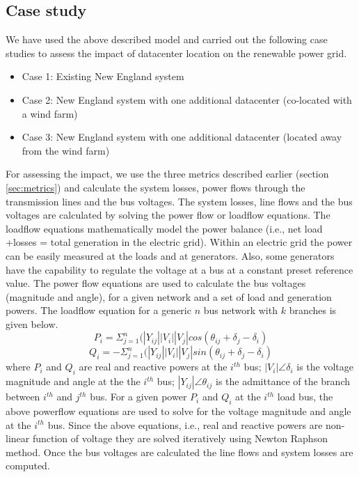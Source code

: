 \begin{itemize}
{\begin{table}[ht]
\begin{center}
\begin{tabular}{|l|l|c|c|}
\end{tabular}
   \vspace{.05in}
\label{tab:wf_setting}
\end{center}
\end{table}
}
\end{itemize}
\subsection{Case study}
We have used the above described model and carried out the following case studies to assess the impact of datacenter location on the renewable power grid.
\begin{itemize}
\item{Case 1: Existing New England system}
\item{Case 2: New England system with one additional datacenter (co-located with a wind farm)}
\item{Case 3: New England system with one additional datacenter (located away from the wind farm)}
\end{itemize}
For assessing the impact, we use the three metrics described earlier (section \ref{sec:metrics}) and calculate the system losses, power flows through the transmission lines and the bus voltages.
The system losses, line flows and the bus voltages are calculated by solving the power flow or loadflow equations. The loadflow equations mathematically model the power balance (i.e., net load +losses = total generation in the electric grid). Within an electric grid the power can be easily measured at the loads and at generators. Also, some generators have the capability to regulate the voltage at a bus at a constant preset reference value. The power flow equations are used to calculate the bus voltages (magnitude and angle), for a given network and a set of load and generation powers. The loadflow equation for a generic $n$ bus network with $k$ branches is given below.
\begin{equation}
P_{i} = \Sigma_{j=1}^{n}(|Y_{ij}||V_{i}||V_{j}|cos(\theta_{ij}+\delta_{j}-\delta_{i})
\end{equation}
\begin{equation}
Q_{i} = -\Sigma_{j=1}^{n}(|Y_{ij}||V_{i}||V_{j}|sin(\theta_{ij}+\delta_{j}-\delta_{i})
\end{equation}
where $P_{i}$ and $Q_{i}$ are real and reactive powers at the $i^{th}$ bus; $|V_{i}| \angle \delta_{i}$ is the voltage magnitude and angle at the the $i^{th}$ bus; $|Y_{ij}| \angle \theta_{ij}$ is the admittance of the branch between $i^{th}$ and $j^{th}$ bus.
For a given power $P_{i}$ and $Q_{i}$ at the $i^{th}$ load bus, the above powerflow equations are used to solve for the voltage magnitude and angle at the $i^{th}$ bus. Since the above equations, i.e., real and reactive powers are non-linear function of voltage they are solved iteratively using Newton Raphson method. Once the bus voltages are calculated the line flows and system losses are computed.
